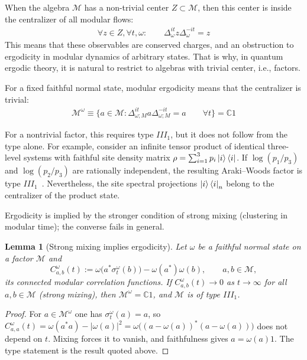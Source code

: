 \documentclass[a4paper,11pt]{article}
\newtheorem{lemma}[theorem]{Lemma}
\theoremstyle{definition}
\begin{document}
When the algebra $\mathcal M$ has a non-trivial center $Z\subset \mathcal M$, then this center is inside the centralizer of all modular flows:
\begin{align}
    \forall z\in Z,\forall t,\omega:\qquad \Delta_{\omega}^{it}z \Delta_\omega^{-it}=z
\end{align}
This means that these observables are conserved charges, and an obstruction to ergodicity in modular dynamics of arbitrary states. That is why, in quantum ergodic theory, it is natural to restrict to algebras with trivial center, i.e., factors.

For a fixed faithful normal state, modular ergodicity means that the centralizer is trivial:
\begin{align}
    \label{eq:modular-ergodicity}
    \mathcal M^\omega\equiv \{a\in \mathcal M:\Delta_{\omega;M}^{it}a\Delta_{\omega;M}^{-it}=a\qquad \forall t\}=\mathbb{C} 1
\end{align}

For a nontrivial factor, this requires type $III_1$, but it does not follow from the
type alone. For example, consider an infinite tensor product of identical three-level
systems with faithful site density matrix
$\rho=\sum_{i=1}^3p_i\ket{i}\bra{i}$.
If $\log(p_1/p_3)$ and $\log(p_2/p_3)$ are rationally independent, the resulting
Araki--Woods factor is type $III_1$~\cite{ArakiWoods1968}.
Nevertheless, the site spectral projections $\ket{i}\bra{i}_n$ belong to the
centralizer of the product state.

Ergodicity is implied by the stronger condition of strong mixing (clustering in modular time); the converse fails in general.

\begin{lemma}[Strong mixing implies ergodicity]\label{lem:mixing-ergodic}
Let $\omega$ be a faithful normal state on a factor $\mathcal M$ and
\begin{equation}\label{eq:modular-correlation}
 C^\omega_{a,b}(t):=\omega\bigl(a^*\sigma^\omega_t(b)\bigr)-\omega(a^*)\omega(b),\qquad a,b\in\mathcal M,
\end{equation}
its connected modular correlation functions. If $C^\omega_{a,b}(t)\to0$ as $t\to\infty$ for all $a,b\in\mathcal M$ (strong mixing), then $\mathcal M^\omega=\mathbb C1$, and $\mathcal M$ is of type $III_1$.
\end{lemma}
\begin{proof}
For $a\in\mathcal M^\omega$ one has $\sigma^\omega_t(a)=a$, so $C^\omega_{a,a}(t)=\omega(a^*a)-|\omega(a)|^2=\omega\bigl((a-\omega(a))^*(a-\omega(a))\bigr)$ does not depend on $t$. Mixing forces it to vanish, and faithfulness gives $a=\omega(a)1$. The type statement is the result quoted above.
\end{proof}
\end{document}
